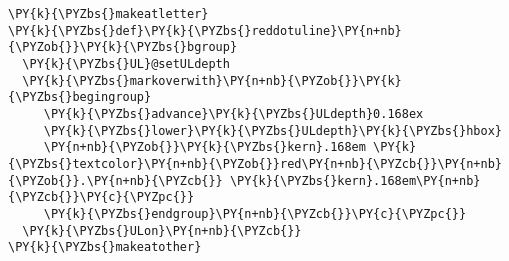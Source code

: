 \begin{Verbatim}[commandchars=\\\{\}]
\PY{k}{\PYZbs{}makeatletter}
\PY{k}{\PYZbs{}def}\PY{k}{\PYZbs{}reddotuline}\PY{n+nb}{\PYZob{}}\PY{k}{\PYZbs{}bgroup}
  \PY{k}{\PYZbs{}UL}@setULdepth
  \PY{k}{\PYZbs{}markoverwith}\PY{n+nb}{\PYZob{}}\PY{k}{\PYZbs{}begingroup}
     \PY{k}{\PYZbs{}advance}\PY{k}{\PYZbs{}ULdepth}0.168ex
     \PY{k}{\PYZbs{}lower}\PY{k}{\PYZbs{}ULdepth}\PY{k}{\PYZbs{}hbox}
     \PY{n+nb}{\PYZob{}}\PY{k}{\PYZbs{}kern}.168em \PY{k}{\PYZbs{}textcolor}\PY{n+nb}{\PYZob{}}red\PY{n+nb}{\PYZcb{}}\PY{n+nb}{\PYZob{}}.\PY{n+nb}{\PYZcb{}} \PY{k}{\PYZbs{}kern}.168em\PY{n+nb}{\PYZcb{}}\PY{c}{\PYZpc{}}
     \PY{k}{\PYZbs{}endgroup}\PY{n+nb}{\PYZcb{}}\PY{c}{\PYZpc{}}
  \PY{k}{\PYZbs{}ULon}\PY{n+nb}{\PYZcb{}}
\PY{k}{\PYZbs{}makeatother}
\end{Verbatim}
